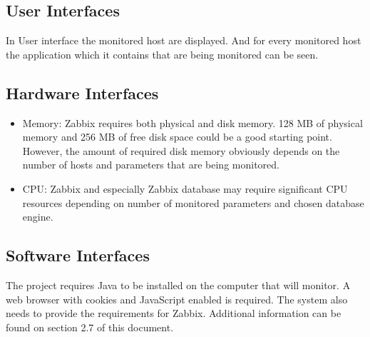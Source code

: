 \documentclass{article}
\begin{document}
\subsection{User Interfaces}

In User interface the monitored host are displayed. And for every monitored host the application which it contains that are being monitored can be seen.
\subsection{Hardware Interfaces}
\begin{itemize}
\item[]Memory:
    Zabbix requires both physical and disk memory. 128 MB of physical memory and 256 MB of free disk space could be a good starting point. However, the amount of required disk memory obviously depends on the number of hosts and parameters that are being monitored.
\item[]CPU:
   Zabbix and especially Zabbix database may require significant CPU resources depending on number of monitored parameters and chosen database engine.
\end{itemize}
\subsection{Software Interfaces}

     The project requires Java to be installed on the computer that will monitor. A web browser with cookies and JavaScript enabled is required. The system also needs to provide the requirements for Zabbix. Additional information can be found on section 2.7 of this document.
\end{document}
